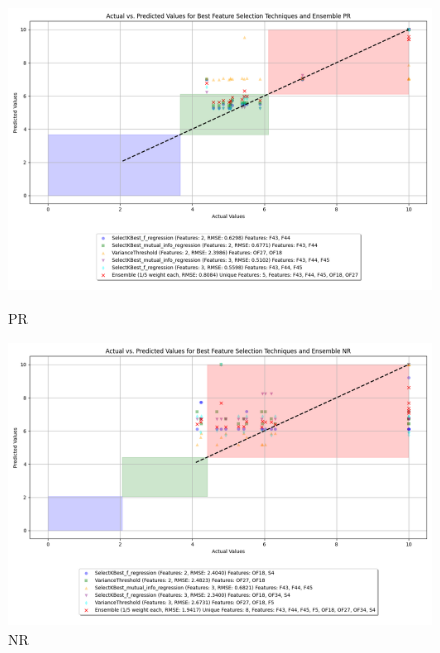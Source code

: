 \begin{figure}[H]
    \centering
    \begin{minipage}{0.45\textwidth}
        \centering
        \includegraphics[width=\linewidth]{reg_section_all/images_reg_featred_ensemble/actual_vs_predicted_smallest_feature_selection_and_ensemble_PR.png}
        \caption{PR}
        \label{fig:pr_reg_featred_smallest_ensemble}
    \end{minipage}\hfill
    \begin{minipage}{0.45\textwidth}
        \centering
        \includegraphics[width=\linewidth]{reg_section_all/images_reg_featred_ensemble/actual_vs_predicted_smallest_feature_selection_and_ensemble_NR.png}
        \caption{NR}
        \label{fig:nr_reg_featred_smallest_ensemble}
    \end{minipage}
\end{figure}

